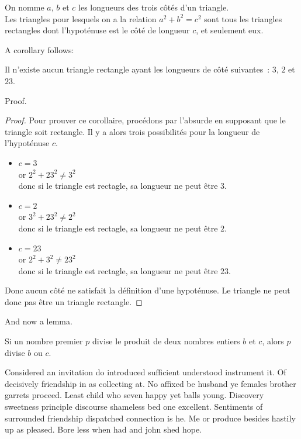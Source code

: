 \documentclass[english,RandD,Confidential]{rapportPFE}  %
\begin{document}
\begin{Theorem}
\label{Th:Pythagore}
On nomme $a$, $b$ et $c$ les longueurs des trois côtés d'un triangle.\\
Les triangles pour lesquels on a la relation $a^{2}+ b^{2} = c^{2}$ sont tous les triangles rectangles dont l'hypoténuse est le côté de longueur $c$, et seulement eux.
\end{Theorem}

A corollary follows:
\begin{Corollary}[]
\label{Cor:TriangleImpossible}
Il n'existe aucun triangle rectangle ayant les longueurs de côté suivantes~: $3$, $2$ et $23$.
\end{Corollary}

Proof.
\begin{proof}
Pour prouver ce corollaire, procédons par l'absurde en supposant que le triangle soit rectangle. Il y a alors trois possibilités pour la longueur de l'hypoténuse $c$.
\begin{itemize}
\item $c=3$\\
or $2^{2}+ 23^{2} \neq 3^{2}$\\
donc si le triangle est rectagle, sa longueur ne peut être $3$.
\item $c=2$\\
or $3^{2}+ 23^{2} \neq 2^{2}$\\
donc si le triangle est rectagle, sa longueur ne peut être $2$.
\item $c=23$\\
or $2^{2}+ 3^{2} \neq 23^{2}$\\
donc si le triangle est rectagle, sa longueur ne peut être $23$.
\end{itemize}
Donc aucun côté ne satisfait la définition d'une hypoténuse. Le triangle ne peut donc pas être un triangle rectangle.
\end{proof}

And now a lemma.
\begin{Lemma}
\label{lem:Euclide}
Si un nombre premier $p$ divise le produit de deux nombres entiers $b$ et $c$, alors $p$ divise $b$ ou $c$.
\end{Lemma}

Considered an invitation do introduced sufficient understood instrument it. Of decisively friendship in as collecting at. No affixed be husband ye females brother garrets proceed. Least child who seven happy yet balls young. Discovery sweetness principle discourse shameless bed one excellent. Sentiments of surrounded friendship dispatched connection is he. Me or produce besides hastily up as pleased. Bore less when had and john shed hope.
\end{document}
